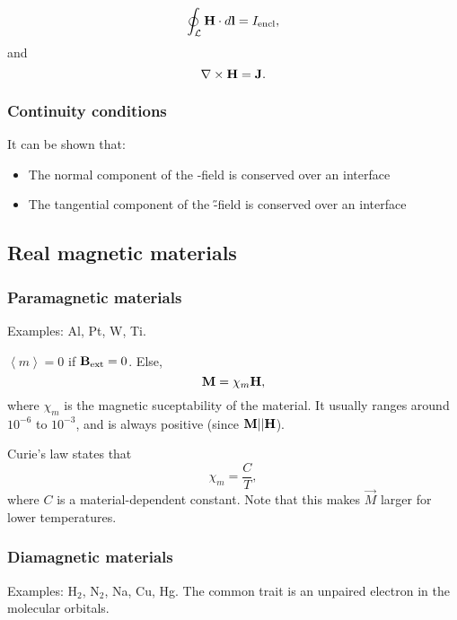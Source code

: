     \begin{equation}
        \label{integrate H eq I}
        \oint_\mathcal{L}\mathbf{H}\cdot d\mathbf{l} = I_{\text{encl}},
    \end{equation}
    and 
    \begin{equation}
        \nabla\times\mathbf{H} = \mathbf{J}.
    \end{equation}
    
    \subsubsection{Continuity conditions}
        It can be shown that:
        \begin{itemize}
            \item The normal component of the \B-field is conserved over an interface
            \item The tangential component of the \H-field is conserved over an interface
        \end{itemize}

\subsection{Real magnetic materials}
    \subsubsection{Paramagnetic materials}
        Examples: Al, Pt, W, Ti.

        $\left<m\right>=0$ if $\mathbf{B}_{\text{ext}} = 0$. Else, 
        \begin{equation}
            \mathbf{M} = \chi_m\mathbf{H},
        \end{equation}
        where $\chi_m$ is the magnetic suceptability of the material. 
        It usually ranges around $10^{-6}$ to $10^{-3}$, and is always positive (since $\mathbf{M} || \mathbf{H}$).

        Curie's law states that 
        \begin{equation}
            \chi_m = \frac{C}{T}, 
        \end{equation}
        where $C$ is a material-dependent constant. Note that this makes $\vec{M}$ larger for lower temperatures.

    \subsubsection{Diamagnetic materials}
        Examples: $\text{H}_2$, $\text{N}_2$, Na, Cu, Hg. The common trait is an unpaired electron in the molecular orbitals.
        
